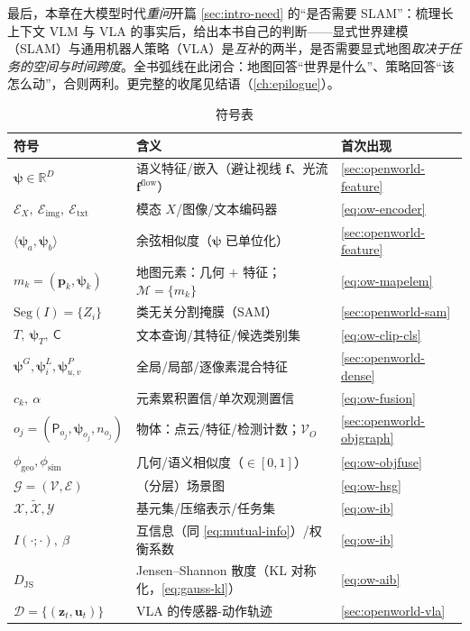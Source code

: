 最后，本章在大模型时代\emph{重问}开篇 \cref{sec:intro-need} 的“是否需要 SLAM”：梳理长上下文 VLM 与 VLA 的事实后，给出本书自己的判断——显式世界建模（SLAM）与通用机器人策略（VLA）是\emph{互补}的两半，是否需要显式地图\emph{取决于任务的空间与时间跨度}。全书弧线在此闭合：地图回答“世界是什么”、策略回答“该怎么动”，合则两利。更完整的收尾见结语（\cref{ch:epilogue}）。

\begin{table}[H]\centering\small
\caption{符号表}
\begin{tabular}{lll}
\toprule
符号 & 含义 & 首次出现 \\
\midrule
$\boldsymbol\psi\in\mathbb{R}^{D}$ & 语义特征/嵌入（避让视线 $\mathbf{f}$、光流 $\mathbf{f}^{\mathrm{flow}}$）& \cref{sec:openworld-feature} \\
$\mathcal{E}_X,\ \mathcal{E}_{\mathrm{img}},\ \mathcal{E}_{\mathrm{txt}}$ & 模态 $X$/图像/文本编码器 & \cref{eq:ow-encoder} \\
$\langle\boldsymbol\psi_a,\boldsymbol\psi_b\rangle$ & 余弦相似度（$\boldsymbol\psi$ 已单位化）& \cref{sec:openworld-feature} \\
$m_k=(\mathbf{p}_k,\boldsymbol\psi_k)$ & 地图元素：几何 $+$ 特征；$\mathcal{M}=\{m_k\}$ & \cref{eq:ow-mapelem} \\
$\mathrm{Seg}(I)=\{Z_i\}$ & 类无关分割掩膜（SAM）& \cref{sec:openworld-sam} \\
$T,\ \boldsymbol\psi_T,\ \mathsf{C}$ & 文本查询/其特征/候选类别集 & \cref{eq:ow-clip-cls} \\
$\boldsymbol\psi^{G},\boldsymbol\psi_i^{L},\boldsymbol\psi_{u,v}^{P}$ & 全局/局部/逐像素混合特征 & \cref{sec:openworld-dense} \\
$c_k,\ \alpha$ & 元素累积置信/单次观测置信 & \cref{eq:ow-fusion} \\
$o_j=(\mathsf{P}_{o_j},\boldsymbol\psi_{o_j},n_{o_j})$ & 物体：点云/特征/检测计数；$\mathcal{V}_O$ & \cref{sec:openworld-objgraph} \\
$\phi_{\mathrm{geo}},\phi_{\mathrm{sim}}$ & 几何/语义相似度（$\in[0,1]$）& \cref{eq:ow-objfuse} \\
$\mathcal{G}=(\mathcal{V},\mathcal{E})$ & （分层）场景图 & \cref{eq:ow-hsg} \\
$\mathcal{X},\tilde{\mathcal{X}},\mathcal{Y}$ & 基元集/压缩表示/任务集 & \cref{eq:ow-ib} \\
$I(\cdot;\cdot),\ \beta$ & 互信息（同 \cref{eq:mutual-info}）/权衡系数 & \cref{eq:ow-ib} \\
$D_{\mathrm{JS}}$ & Jensen--Shannon 散度（$\mathrm{KL}$ 对称化，\cref{eq:gauss-kl}）& \cref{eq:ow-aib} \\
$\mathcal{D}=\{(\mathbf{z}_t,\mathbf{u}_t)\}$ & VLA 的传感器-动作轨迹 & \cref{sec:openworld-vla} \\
\bottomrule
\end{tabular}
\end{table}

